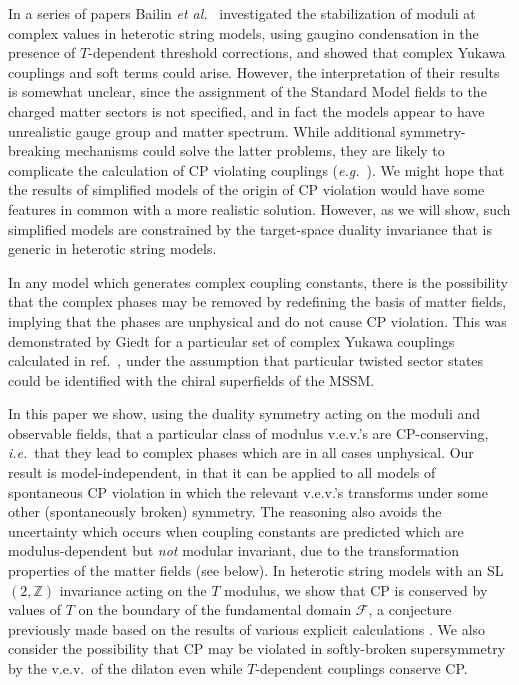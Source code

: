 \documentclass[a4paper,12pt]{article}
\begin{document}
In a series of papers Bailin {\em et al.\/}\ \cite{Bailin:1998iz+97,Bailin:1998xx} investigated the stabilization of moduli at complex values in heterotic string models, using gaugino condensation in the presence of $T$-dependent threshold corrections, and showed that complex Yukawa couplings and soft terms could arise. However, the interpretation of their results is somewhat unclear, since the assignment of the Standard Model fields to the charged matter sectors is not specified, and in fact the models appear to have unrealistic gauge group and matter spectrum. While additional symmetry-breaking mechanisms could solve the latter problems, they are likely to complicate the calculation of CP violating couplings ({\em e.g.\/}\ \cite{Bailin:1998yt}). We might hope that the results of simplified models of the origin of CP violation would have some features in common with a more realistic solution. However, as we will show, such simplified models are constrained by the target-space duality invariance that is generic in heterotic string models.

In any model which generates complex coupling constants, there is the possibility that the complex phases may be removed by redefining the basis of matter fields, implying that the phases are unphysical and do not cause CP violation. This was demonstrated by Giedt \cite{Giedt2000} for a particular set of complex Yukawa couplings calculated in ref.\ \cite{Bailin:1998xx}, under the assumption that particular twisted sector states could be identified with the chiral superfields of the MSSM. 

In this paper we show, using the duality symmetry acting on the moduli and observable fields, that a particular class of modulus v.e.v.'s are CP-conserving, {\em i.e.\/}\ that they lead to complex phases which are in all cases unphysical. Our result is model-independent, in that it can be applied to all models of spontaneous CP violation in which the relevant v.e.v.'s transforms under some other (spontaneously broken) symmetry. The reasoning also avoids the uncertainty which occurs when coupling constants are predicted which are modulus-dependent but {\em not}\/ modular invariant, due to the transformation properties of the matter fields (see below). In heterotic string models with an SL$(2,\mathbb{Z})$ invariance acting on the $T$ modulus, we show that CP is conserved by values of $T$ on the boundary of the fundamental domain $\mathcal{F}$, a conjecture previously made \cite{BKL_unpub} based on the results of various explicit calculations \cite{Bailin:1998iz+97}. We also consider the possibility that CP may be violated in softly-broken supersymmetry by the v.e.v.\ of the dilaton even while $T$-dependent couplings conserve CP.
\end{document}
